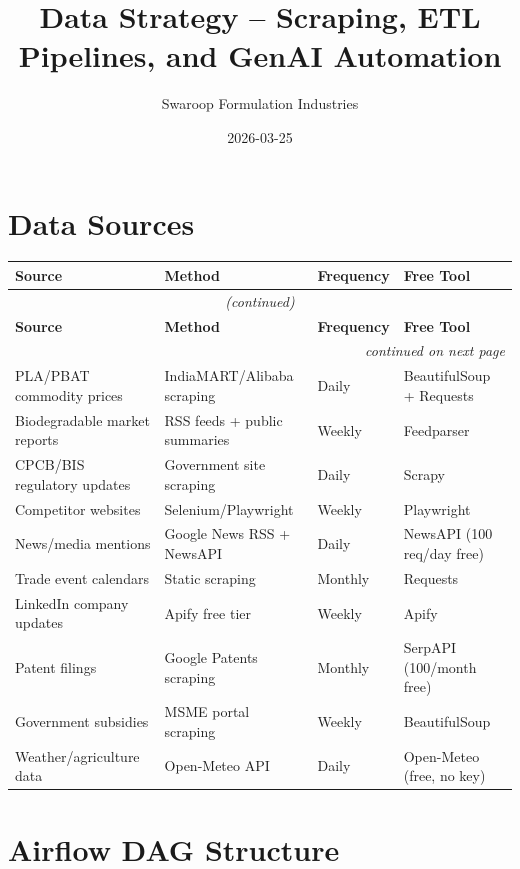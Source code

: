 \documentclass{article}
\title{Data Strategy -- Scraping, ETL Pipelines, and GenAI Automation}
\author{Swaroop Formulation Industries}
\date{2026-03-25}
\begin{document}
\maketitle

\section{Data Sources}

\begin{longtable}{@{}p{3.2cm}p{3.5cm}p{1.8cm}p{3.8cm}@{}}
\toprule
\textbf{Source} & \textbf{Method} & \textbf{Frequency} & \textbf{Free Tool} \\
\midrule
\endfirsthead
\multicolumn{4}{c}{\textit{(continued)}} \\
\toprule
\textbf{Source} & \textbf{Method} & \textbf{Frequency} & \textbf{Free Tool} \\
\midrule
\endhead
\midrule
\multicolumn{4}{r}{\textit{continued on next page}} \\
\endfoot
\bottomrule
\endlastfoot
PLA/PBAT commodity prices & IndiaMART/Alibaba scraping & Daily & BeautifulSoup + Requests \\
Biodegradable market reports & RSS feeds + public summaries & Weekly & Feedparser \\
CPCB/BIS regulatory updates & Government site scraping & Daily & Scrapy \\
Competitor websites & Selenium/Playwright & Weekly & Playwright \\
News/media mentions & Google News RSS + NewsAPI & Daily & NewsAPI (100 req/day free) \\
Trade event calendars & Static scraping & Monthly & Requests \\
LinkedIn company updates & Apify free tier & Weekly & Apify \\
Patent filings & Google Patents scraping & Monthly & SerpAPI (100/month free) \\
Government subsidies & MSME portal scraping & Weekly & BeautifulSoup \\
Weather/agriculture data & Open-Meteo API & Daily & Open-Meteo (free, no key) \\
\end{longtable}

\section{Airflow DAG Structure}
\end{document}

